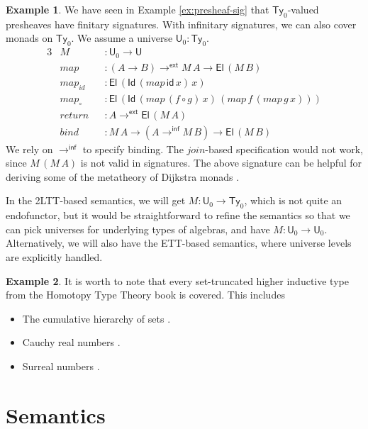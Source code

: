 \documentclass[12pt,a4paper,twoside,openany]{book}
\theoremstyle{remark}
\theoremstyle{definition}
\newtheorem{myexample}{Example}
\theoremstyle{theorem}
\newcommand{\mi}[1]{\mathit{#1}}
\newcommand{\ms}[1]{\mathsf{#1}}
\newcommand{\id}{\mathsf{id}}
\newcommand{\Ty}{\mathsf{Ty}}
\newcommand{\U}{\mathsf{U}}
\newcommand{\El}{\mathsf{El}}
\newcommand{\Id}{\mathsf{Id}}
\newcommand{\toe}{\to^{\ms{ext}}}
\newcommand{\toinf}{\to^{\ms{inf}}}
\begin{document}
\begin{myexample}
We have seen in Example \ref{ex:presheaf-sig} that $\Ty_0$-valued presheaves have finitary signatures.
With infinitary signatures, we can also cover monads on $\Ty_0$. We assume a
universe $\U_0 : \Ty_0$.
\begin{alignat*}{3}
  &M              &&: \U_0 \to \U\\
  &\mi{map}       &&: (A \to B) \toe M\,A \to \El\,(M\,B)\\
  &\mi{map_{id}}   &&: \El\,(\Id\,(\mi{map}\,\id\,x)\,x)\\
  &\mi{map_{\circ}} &&: \El\,(\Id\,(\mi{map}\,(f \circ g)\,x)\,(\mi{map}\,f\,(\mi{map}\,g\,x)))\\
  &\mi{return}    &&: A \toe \El\,(M\,A)\\
  &\mi{bind}      &&: M\,A \to (A \toinf M\,B) \to \El\,(M\,B)
\end{alignat*}
We rely on $\toinf$ to specify binding. The $\mi{join}$-based specification
would not work, since $M\,(M\,A)$ is not valid in signatures. The above
signature can be helpful for deriving some of the metatheory of Dijkstra monads
\cite[Section~5]{dijkstramonad}.

In the 2LTT-based semantics, we will get $M : \U_0 \to \Ty_0$, which is not
quite an endofunctor, but it would be straightforward to refine the semantics so
that we can pick universes for underlying types of algebras, and have $M : \U_0
\to \U_0$. Alternatively, we will also have the ETT-based semantics, where
universe levels are explicitly handled.
\end{myexample}

\begin{myexample}
It is worth to note that every set-truncated higher inductive type from the
Homotopy Type Theory book \cite{hottbook} is covered. This includes
\begin{itemize}
\item The cumulative hierarchy of sets \cite[Section~10.5]{hottbook}.
\item Cauchy real numbers \cite[Section~11.3]{hottbook}.
\item Surreal numbers \cite[Section~11.6]{hottbook}.
\end{itemize}
\end{myexample}

\section{Semantics}
\end{document}

